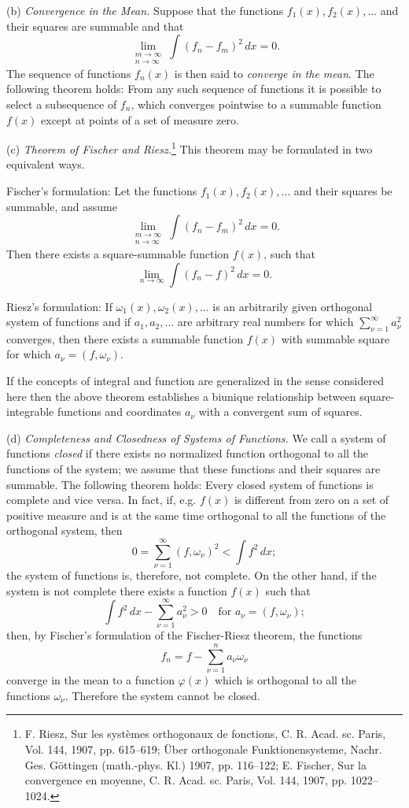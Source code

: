 (b) \emph{Convergence in the Mean.} Suppose that the functions $f_1(x),f_2(x),\ldots$ and their squares are summable and that
\[
\lim_{\substack{m\to\infty\\ n\to\infty}}\int(f_n-f_m)^2\,dx=0.
\]
The sequence of functions $f_n(x)$ is then said to \emph{converge in the mean}. The following theorem holds: From any such sequence of functions it is possible to select a subsequence of $f_n$, which converges pointwise to a summable function $f(x)$ except at points of a set of measure zero.

(c) \emph{Theorem of Fischer and Riesz.}\footnote{F. Riesz, Sur les syst\`emes orthogonaux de fonctions, C. R. Acad. sc. Paris, Vol. 144, 1907, pp. 615--619; \"Uber orthogonale Funktionensysteme, Nachr. Ges. G\"ottingen (math.-phys. Kl.) 1907, pp. 116--122; E. Fischer, Sur la convergence en moyenne, C. R. Acad. sc. Paris, Vol. 144, 1907, pp. 1022--1024.} This theorem may be formulated in two equivalent ways.

Fischer's formulation: Let the functions $f_1(x),f_2(x),\ldots$ and their squares be summable, and assume
\[
\lim_{\substack{m\to\infty\\ n\to\infty}}\int(f_n-f_m)^2\,dx=0.
\]
Then there exists a square-summable function $f(x)$, such that
\[
\lim_{n\to\infty}\int(f_n-f)^2\,dx=0.
\]

Riesz's formulation: If $\omega_1(x),\omega_2(x),\ldots$ is an arbitrarily given orthogonal system of functions and if $a_1,a_2,\ldots$ are arbitrary real numbers for which $\sum_{\nu=1}^\infty a_\nu^2$ converges, then there exists a summable function $f(x)$ with summable square for which $a_\nu=(f,\omega_\nu)$.

If the concepts of integral and function are generalized in the sense considered here then the above theorem establishes a biunique relationship between square-integrable functions and coordinates $a_\nu$ with a convergent sum of squares.

(d) \emph{Completeness and Closedness of Systems of Functions.} We call a system of functions \emph{closed} if there exists no normalized function orthogonal to all the functions of the system; we assume that these functions and their squares are summable. The following theorem holds: Every closed system of functions is complete and vice versa. In fact, if, e.g. $f(x)$ is different from zero on a set of positive measure and is at the same time orthogonal to all the functions of the orthogonal system, then
\[
0=\sum_{\nu=1}^\infty(f,\omega_\nu)^2<\int f^2\,dx;
\]
the system of functions is, therefore, not complete. On the other hand, if the system is not complete there exists a function $f(x)$ such that
\[
\int f^2\,dx-\sum_{\nu=1}^\infty a_\nu^2>0
\quad\text{for }a_\nu=(f,\omega_\nu);
\]
then, by Fischer's formulation of the Fischer-Riesz theorem, the functions
\[
f_n=f-\sum_{\nu=1}^n a_\nu\omega_\nu
\]
converge in the mean to a function $\varphi(x)$ which is orthogonal to all the functions $\omega_\nu$. Therefore the system cannot be closed.

